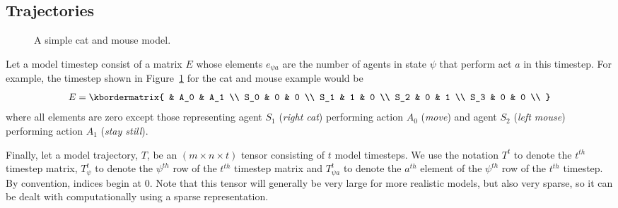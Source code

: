 \documentclass{article}
\begin{document}
\subsection{Trajectories}

\begin{figure}
	\centering
	\caption{A simple cat and mouse model.\label{fig:AB-MCMC-1}}
\end{figure}


Let a model timestep consist of a matrix $E$ whose elements $e_{\psi a}$ are the number of agents in state $\psi$ that perform act $a$ in this timestep. For example, the timestep shown in Figure~\ref{fig:AB-MCMC-1} for the cat and mouse example would be
\[
E = \kbordermatrix{
	& A_0 & A_1 \\
	S_0 & 0 & 0 \\
	S_1 & 1 & 0 \\
	S_2 & 0  & 1 \\
	S_3 & 0 & 0 \\
}
\]
where all elements are zero except those representing agent $S_1$ (\textit{right cat}) performing action $A_0$ (\textit{move}) and agent $S_2$ (\textit{left mouse}) performing action $A_1$ (\textit{stay still}).

Finally, let a model trajectory, $T$, be an $(m\times n\times t)$ tensor consisting of $t$ model timesteps. We use the notation $T^t$ to denote the $t^{th}$ timestep matrix, $T^t_\psi$ to denote the $\psi^{th}$ row of the $t^{th}$ timestep matrix and $T^t_{\psi a}$ to denote the $a^{th}$ element of the $\psi^{th}$ row of the $t^{th}$ timestep. By convention, indices begin at 0. Note that this tensor will generally be very large for more realistic models, but also very sparse, so it can be dealt with computationally using a sparse representation.
\end{document}
